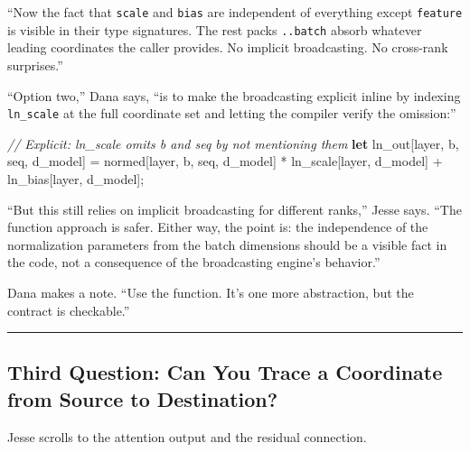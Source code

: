 \documentclass[11pt,]{article}
\newenvironment{Shaded}{}{}
\newcommand{\CommentTok}[1]{\textcolor[rgb]{0.38,0.63,0.69}{\textit{#1}}}
\newcommand{\KeywordTok}[1]{\textcolor[rgb]{0.00,0.44,0.13}{\textbf{#1}}}
\newcommand{\NormalTok}[1]{#1}
\newcommand{\OperatorTok}[1]{\textcolor[rgb]{0.40,0.40,0.40}{#1}}
\begin{document}
``Now the fact that \texttt{scale} and \texttt{bias} are independent of
everything except \texttt{feature} is visible in their type signatures.
The rest packs \texttt{..batch} absorb whatever leading coordinates the
caller provides. No implicit broadcasting. No cross-rank surprises.''

``Option two,'' Dana says, ``is to make the broadcasting explicit inline
by indexing \texttt{ln\_scale} at the full coordinate set and letting
the compiler verify the omission:''

\begin{Shaded}
\begin{Highlighting}[]
\CommentTok{// Explicit: ln_scale omits b and seq by not mentioning them}
\KeywordTok{let}\NormalTok{ ln_out}\OperatorTok{[}\NormalTok{layer, b, seq, d_model}\OperatorTok{]}\NormalTok{ =}
\NormalTok{    normed}\OperatorTok{[}\NormalTok{layer, b, seq, d_model}\OperatorTok{]}\NormalTok{ * ln_scale}\OperatorTok{[}\NormalTok{layer, d_model}\OperatorTok{]}
\NormalTok{    + ln_bias}\OperatorTok{[}\NormalTok{layer, d_model}\OperatorTok{]}\NormalTok{;}
\end{Highlighting}
\end{Shaded}

``But this still relies on implicit broadcasting for different ranks,''
Jesse says. ``The function approach is safer. Either way, the point is:
the independence of the normalization parameters from the batch
dimensions should be a visible fact in the code, not a consequence of
the broadcasting engine's behavior.''

Dana makes a note. ``Use the function. It's one more abstraction, but
the contract is checkable.''

\begin{center}\rule{0.5\linewidth}{0.4pt}\end{center}

\hypertarget{third-question-can-you-trace-a-coordinate-from-source-to-destination}{%
\subsection{Third Question: Can You Trace a Coordinate from Source to
Destination?}\label{third-question-can-you-trace-a-coordinate-from-source-to-destination}}

Jesse scrolls to the attention output and the residual connection.
\end{document}

